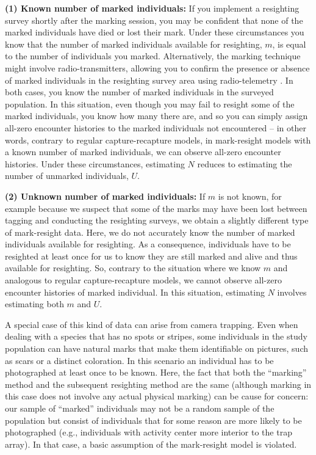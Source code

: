 {\flushleft \bf (1) Known number of marked individuals:} If you
implement a resighting survey shortly after the marking session, you
may be confident that none of the marked individuals have died or lost
their mark. Under these circumstances you know that the number of
marked individuals available for resighting, $m$, is equal to the
number of individuals you marked. Alternatively, the marking technique
might involve radio-transmitters, allowing you to confirm the presence
or absence of marked individuals in the resighting survey area using
radio-telemetry \citep{white_shenk:2001}. In both cases, you know the
number of marked individuals in the surveyed population.  In this
situation, even though you may fail to resight some of the marked
individuals, you know how many there are, and so you can simply assign
all-zero encounter histories to the marked individuals not encountered
-- in other words, contrary to regular capture-recapture models, in
mark-resight models with a known number of marked individuals, we can
observe all-zero encounter histories. Under these circumstances,
estimating $N$ reduces to estimating the number of unmarked
individuals, $U$.

{\flushleft \bf (2) Unknown number of marked individuals:} If $m$ is
not known, for example because we suspect that some of the marks may
have been lost between tagging and conducting the resighting surveys,
we obtain a slightly different type of mark-resight data. Here, we do
not accurately know the number of marked individuals available for
resighting. As a consequence, individuals have to be resighted at
least once for us to know they are still marked and alive and thus
available for resighting. So, contrary to the situation where we know
$m$ and analogous to regular capture-recapture models, we cannot
observe all-zero encounter histories of marked individual. In this
situation, estimating $N$ involves estimating both $m$ and $U$.

A special case of this kind of data can arise from camera
trapping. Even when dealing with a species that has no spots or
stripes, some individuals in the study population can have natural
marks that make them identifiable on pictures, such as scars or a
distinct coloration. In this scenario an individual has to be
photographed at least once to be known. Here, the fact that both the
``marking'' method and the subsequent resighting method are the same
(although marking in this case does not involve any actual physical
marking) can be cause for concern: our sample of ``marked''
individuals may not be a random sample of the population but consist
of individuals that for some reason are more likely to be
photographed (e.g., individuals with activity center more interior to
the trap array). In that case, a basic assumption of the mark-resight
model is violated.

